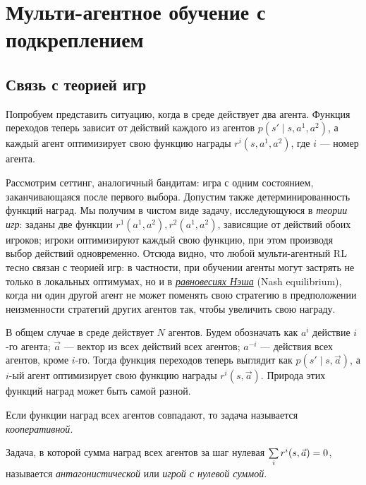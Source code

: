 \section{Мульти-агентное обучение с подкреплением}

\subsection{Связь с теорией игр}

Попробуем представить ситуацию, когда в среде действует два агента. Функция переходов теперь зависит от действий каждого из агентов $p(s' \mid s, a^1, a^2)$, а каждый агент оптимизирует свою функцию награды $r^i(s, a^1, a^2)$, где $i$ --- номер агента.

Рассмотрим сеттинг, аналогичный бандитам: игра с одним состоянием, заканчивающаяся после первого выбора. Допустим также детерминированность функций наград. Мы получим в чистом виде задачу, исследующуюся в \emph{теории игр}: заданы две функции $r^1(a^1, a^2), r^2(a^1, a^2)$, зависящие от действий обоих игроков; игроки оптимизируют каждый свою функцию, при этом производя выбор действий одновременно. Отсюда видно, что любой мульти-агентный RL тесно связан с теорией игр: в частности, при обучении агенты могут застрять не только в локальных оптимумах, но и в \href{https://ru.wikipedia.org/wiki/\%D0\%A0\%D0\%B0\%D0\%B2\%D0\%BD\%D0\%BE\%D0\%B2\%D0\%B5\%D1\%81\%D0\%B8\%D0\%B5_\%D0\%9D\%D1\%8D\%D1\%88\%D0\%B0}{\emph{равновесиях Нэша}} (Nash equilibrium), когда ни один другой агент не может поменять свою стратегию в предположении неизменности стратегий других агентов так, чтобы увеличить свою награду.

В общем случае в среде действует $N$ агентов. Будем обозначать как $a^i$ действие $i$-го агента; $\vec{a}$ --- вектор из всех действий всех агентов; $a^{-i}$ --- действия всех агентов, кроме $i$-го. Тогда функция переходов теперь выглядит как $p(s' \mid s, \vec{a})$, а $i$-ый агент оптимизирует свою функцию награды $r^i(s, \vec{a})$. Природа этих функций наград может быть самой разной.

\begin{definition}
Если функции наград всех агентов совпадают, то задача называется \emph{кооперативной}.
\end{definition}

\begin{definition}
Задача, в которой сумма наград всех агентов за шаг нулевая $\sum\limits_{i} r^i(s, \vec{a}) \HM= 0$, называется \emph{антагонистической} или \emph{игрой с нулевой суммой}.
\end{definition}

